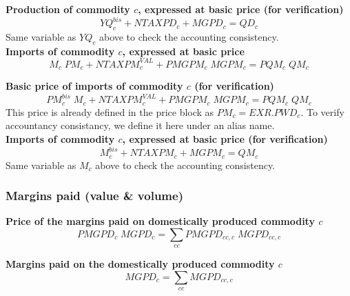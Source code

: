\documentclass[12pt]{article}
\numberwithin{equation}{section}
\begin{document}
\noindent\textbf{Production of commodity $c$, expressed at basic price (for verification)} \\
\begin{dmath}
YQ^{bis}_{c} + NTAXPD_{c} + MGPD_{c} = QD_{c}
\end{dmath}
Same variable as $YQ_{c}$ above to check the accounting consistency. \\

\noindent\textbf{Imports of commodity $c$, expressed at basic price} \\
\begin{dmath}
M_{c} \; PM_{c} + NTAXPM^{VAL}_{c} + PMGPM_{c} \; MGPM_{c} = PQM_{c} \; QM_{c}
\end{dmath}

\noindent\textbf{Basic price of imports of commodity $c$ (for verification)} \\
\begin{dmath}
PM^{bis}_{c} \; M_{c} + NTAXPM^{VAL}_{c} + PMGPM_{c} \; MGPM_{c} = PQM_{c} \; QM_{c}
\end{dmath}
 This price is already defined in the price block as $PM_{c} = EXR . PWD_{c}$. To verify accountancy consistancy, we define it here under an alias name. \\

\noindent\textbf{Imports of commodity $c$, expressed at basic price (for verification)} \\
\begin{dmath}
M^{bis}_{c} + NTAXPM_{c} + MGPM_{c} = QM_{c}
\end{dmath}
Same variable as $M_{c}$ above to check the accounting consistency. \\



\subsubsection{Margins paid (value \& volume)}


\noindent\textbf{Price of the margins paid on domestically produced commodity $c$} \\
\begin{dmath}
PMGPD_{c} \; MGPD_{c} = \sum_{cc} PMGPD_{cc, c} \; MGPD_{cc, c}
\end{dmath}

\noindent\textbf{Margins paid on the domestically produced commodity $c$} \\
\begin{dmath}
MGPD_{c} = \sum_{cc} MGPD_{cc, c}
\end{dmath}
\end{document}
